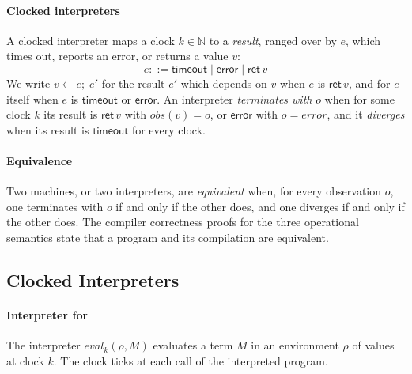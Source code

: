\paragraph{Clocked interpreters}

A clocked interpreter maps a clock $k \in \mathbb{N}$ to a
\emph{result}, ranged over by $e$, which times out, reports an error,
or returns a value $v$:
\[
  e ::= \mathsf{timeout} \mid \mathsf{error} \mid \mathsf{ret}\,v
\]
We write $v \leftarrow e;\; e'$ for the result $e'$ which depends on $v$ when
$e$ is $\mathsf{ret}\,v$, and for $e$ itself when $e$ is $\mathsf{timeout}$ or
$\mathsf{error}$. An interpreter \emph{terminates with} $o$ when for some clock
$k$ its result is $\mathsf{ret}\,v$ with $\mathit{obs}(v) = o$, or
$\mathsf{error}$ with $o = \mathit{error}$, and it \emph{diverges} when its
result is $\mathsf{timeout}$ for every clock.

\paragraph{Equivalence}

Two machines, or two interpreters, are \emph{equivalent} when, for every
observation $o$, one terminates with $o$ if and only if the other does, and one
diverges if and only if the other does. The compiler correctness proofs for the
three operational semantics state that a program and its compilation are
equivalent.

\subsection{Clocked Interpreters}
\label{app:interp}

\paragraph{Interpreter for \fpc}

The interpreter $\mathit{eval}_k(\rho, M)$ evaluates a term $M$ in an
environment $\rho$ of values at clock $k$. The clock ticks at each call
of the interpreted program.

